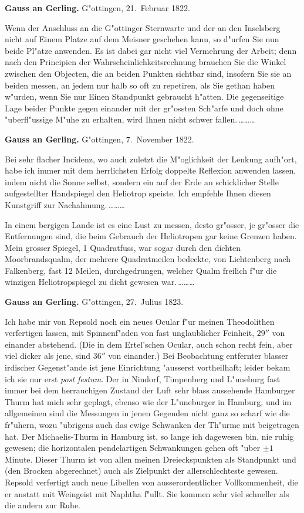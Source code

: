 \documentclass[12pt,a4paper]{article}
\theoremstyle{plain}
\theoremstyle{definition}
\theoremstyle{remark}
\begin{document}
\newpage
\noindent \textbf{Gauss an Gerling.} G"ottingen, 21.~Februar 1822.

\medskip
\noindent Wenn der Anschluss an die G"ottinger Sternwarte und der an den Inselsberg nicht auf Einem Platze auf dem Meisner geschehen kann, so d"urfen Sie nun beide Pl"atze anwenden. Es ist dabei gar nicht viel Vermehrung der Arbeit; denn nach den Principien der Wahrscheinlichkeitsrechnung brauchen Sie die Winkel zwischen den Objecten, die an beiden Punkten sichtbar sind, insofern Sie sie an beiden messen, an jedem nur halb so oft zu repetiren, als Sie gethan haben w"urden, wenn Sie nur Einen Standpunkt gebraucht h"atten. Die gegenseitige Lage beider Punkte gegen einander mit der gr"ossten Sch"arfe und doch ohne "uberfl"ussige M"uhe zu erhalten, wird Ihnen nicht schwer fallen.\,\ldots\ldots\ldots

\medskip
\noindent \textbf{Gauss an Gerling.} G"ottingen, 7.~November 1822.

\medskip
\noindent Bei sehr flacher Incidenz, wo auch zuletzt die M"oglichkeit der Lenkung aufh"ort, habe ich immer mit dem herrlichsten Erfolg doppelte Reflexion anwenden lassen, indem nicht die Sonne selbst, sondern ein auf der Erde an schicklicher Stelle aufgestellter Handspiegel den Heliotrop speiste. Ich empfehle Ihnen diesen Kunstgriff zur Nachahmung.\,\ldots\ldots\ldots

In einem bergigen Lande ist es eine Lust zu messen, desto gr"osser, je gr"osser die Entfernungen sind, die beim Gebrauch der Heliotropen gar keine Grenzen haben. Mein grosser Spiegel, 1 Quadratfuss, war sogar durch den dichten Moorbrandsqualm, der mehrere Quadratmeilen bedeckte, von Lichtenberg nach Falkenberg, fast 12 Meilen, durchgedrungen, welcher Qualm freilich f"ur die winzigen Heliotropspiegel zu dicht gewesen war.\,\ldots\ldots\ldots

\newpage
\noindent \textbf{Gauss an Gerling.} G"ottingen, 27.~Julius 1823.

\medskip
\noindent Ich habe mir von Repsold noch ein neues Ocular f"ur meinen Theodolithen verfertigen lassen, mit Spinnenf"aden von fast unglaublicher Feinheit, $29''$ von einander abstehend. (Die in dem Ertel'schen Ocular, auch schon recht fein, aber viel dicker als jene, sind $36''$ von einander.) Bei Beobachtung entfernter blasser irdischer Gegenst"ande ist jene Einrichtung "ausserst vortheilhaft; leider bekam ich sie nur erst \emph{post festum}. Der in Nindorf, Timpenberg und L"uneburg fast immer bei dem herrauchigen Zustand der Luft sehr blass aussehende Hamburger Thurm hat mich sehr geplagt, ebenso wie der L"uneburger in Hamburg, und im allgemeinen sind die Messungen in jenen Gegenden nicht ganz so scharf wie die fr"uhern, wozu "ubrigens auch das ewige Schwanken der Th"urme mit beigetragen hat. Der Michaelis-Thurm in Hamburg ist, so lange ich dagewesen bin, nie ruhig gewesen; die horizontalen pendelartigen Schwankungen gehen oft "uber $\pm 1$ Minute. Dieser Thurm ist von allen meinen Dreieckspunkten als Standpunkt und (den Brocken abgerechnet) auch als Zielpunkt der allerschlechteste gewesen. Repsold verfertigt auch neue Libellen von ausserordentlicher Vollkommenheit, die er anstatt mit Weingeist mit Naphtha f"ullt. Sie kommen sehr viel schneller als die andern zur Ruhe.
\end{document}
